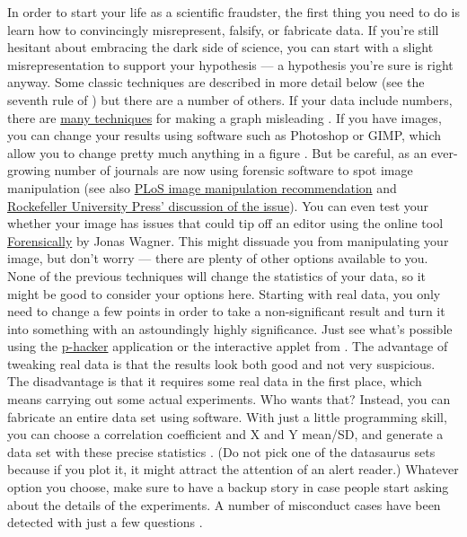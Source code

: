 \documentclass[a4paper,10pt,onecolumn]{article}
\begin{document}
In order to start your life as a scientific fraudster, the
first thing you need to do is learn how to convincingly
misrepresent, falsify, or fabricate data. If you're still hesitant about
embracing the dark side of science, you can start with a slight
misrepresentation to support your hypothesis --- a hypothesis you're sure is right anyway. Some classic techniques are
described in more detail below (see the seventh rule of \citep{rougier:2014}) but there are a number of others. If your data include numbers, there are \href{https://en.wikipedia.org/wiki/Misleading_graph}{many
  techniques} for making a graph misleading \citep{wainer:1984,raschke:2008}. If you have images, you
can change your results using
software such as Photoshop or GIMP, which allow you to change pretty
much anything in a figure \citep{cromey:2012, hendricks:2011}. But be careful, as an ever-growing number of
journals are now using forensic software to spot image manipulation
\citep{white:2007, rossner:2004,hsu:2015} (see also
\href{http://journals.plos.org/ploscompbiol/s/figures#loc-image-manipulation}{PLoS
  image manipulation recommendation} and \href{http://jcb.rupress.org/content/166/1/11}{Rockefeller University Press' discussion of the issue}). You can even test your whether your image has issues that could tip off an editor using the online tool \href{https://29a.ch/photo-forensics/#forensic-magnifier}{Forensically}
by Jonas Wagner. This might dissuade you from manipulating your image, but don't worry --- there are plenty of other options available to you.\\


None of the previous techniques will change the statistics of your
data, so it might be good to consider your options here. Starting with real
data, you only need to change a few points in order to take a non-significant
result and turn it into something with an astoundingly highly significance. Just see what's possible using the
\href{http://shinyapps.org/apps/p-hacker/}{p-hacker} application
\citep{schonbrodt:2015} or the interactive applet from
\citep{aschwanden:2015}. The advantage of tweaking real data is that the results  look both good and not very
suspicious. The disadvantage is that it requires some real data in the first
place, which means carrying out some actual experiments. Who wants that? Instead, you can fabricate an entire data set using software. With just a little programming skill, you can choose a correlation coefficient and X and Y mean/SD, and generate a data set with these precise
statistics \citep{matejka:2017}. (Do not pick one of the datasaurus sets because if you
plot it, it might attract the attention of an alert reader.) Whatever option you choose, make sure to
have a backup story in case people start asking about the details of the experiments. A
number of misconduct cases have been detected with just a few questions
\citep{vastag:2006}.
\end{document}
